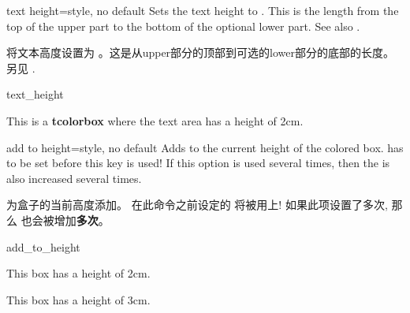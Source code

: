 \begin{docTcbKey}[][doc new=2014-10-31]{text height}{=}{style, no default}
Sets the text height to . This is the length from the top 
of the upper part to the bottom of the optional lower part.
See also .

将文本高度设置为 。这是从upper部分的顶部到可选的lower部分的底部的长度。另见 .


\begin{exdispExample}{text_height}

\begin{tcolorbox}[text height=2cm]
This is a \textbf{tcolorbox} where the text area has a height of 2cm.
\end{tcolorbox}
\end{exdispExample}
\end{docTcbKey}





\begin{docTcbKey}[][doc new=2014-11-07]{add to height}{=}{style, no default}
Adds  to the current height of the colored box.
 has to be set before this key is used!
If this option is used several times, then the  is
also increased several times.

为盒子的当前高度添加。%
在此命令之前设定的  将被用上!%
如果此项设置了多次, 那么  也会被增加{\bf 多次}。
\begin{exdispExample}{add_to_height}

\begin{tcolorbox}
This box has a height of 2cm.
\end{tcolorbox}
\begin{tcolorbox}[add to height=1cm]
This box has a height of 3cm.
\end{tcolorbox}
\end{exdispExample}
\end{docTcbKey}


